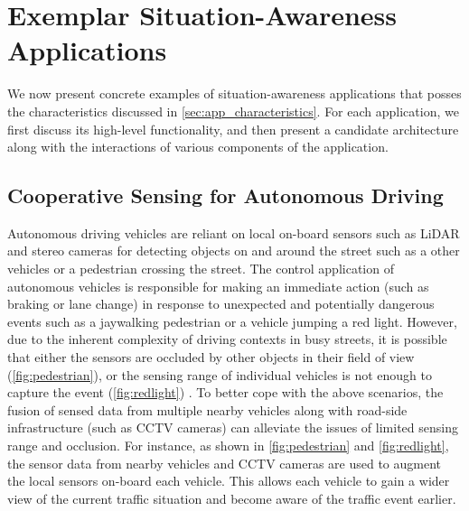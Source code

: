 \section{Exemplar Situation-Awareness Applications}
We now present concrete examples of situation-awareness applications that posses the characteristics discussed in \cref{sec:app_characteristics}. For each application, we first discuss its high-level functionality, and then present a candidate architecture along with the interactions of various components of the application. 
\subsection{Cooperative Sensing for Autonomous Driving}
Autonomous driving vehicles are reliant on local on-board sensors such as LiDAR and stereo cameras for detecting objects on and around the street such as a other vehicles or a pedestrian crossing the street. The control application of autonomous vehicles is responsible for making an immediate action (such as braking or lane change) in response to unexpected and potentially dangerous events such as a jaywalking pedestrian or a vehicle jumping a red light. However, due to the inherent complexity of driving contexts in busy streets, it is possible that either the sensors are occluded by other objects in their field of view (\cref{fig:pedestrian}), or the sensing range of individual vehicles is not enough to capture the event (\cref{fig:redlight}) \cite{fusioneye}. To better cope with the above scenarios, the fusion of sensed data from multiple nearby vehicles along with road-side infrastructure (such as CCTV cameras) can alleviate the issues of limited sensing range and occlusion. For instance, as shown in \cref{fig:pedestrian} and \cref{fig:redlight}, the sensor data from nearby vehicles and CCTV cameras are used to augment the local sensors on-board each vehicle. This allows each vehicle to gain a wider view of the current traffic situation and become aware of the traffic event earlier.
